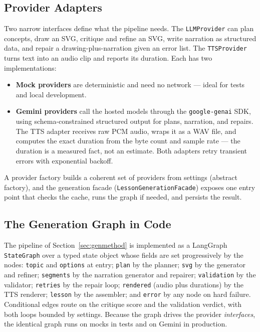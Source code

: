 \subsection{Provider Adapters}

Two narrow interfaces define what the pipeline needs. The \texttt{LLMProvider}
can plan concepts, draw an SVG, critique and refine an SVG, write narration
as structured data, and repair a drawing-plus-narration given an error list.
The \texttt{TTSProvider} turns text into an audio clip and reports its
duration. Each has two implementations:

\begin{itemize}
  \item \textbf{Mock providers} are deterministic and need no network ---
        ideal for tests and local development.
  \item \textbf{Gemini providers} call the hosted models through the
        \texttt{google-genai} SDK, using schema-constrained structured output
        for plans, narration, and repairs. The TTS adapter receives raw PCM
        audio, wraps it as a WAV file, and computes the exact duration from
        the byte count and sample rate --- the duration is a measured fact,
        not an estimate. Both adapters retry transient errors with
        exponential backoff.
\end{itemize}

A provider factory builds a coherent set of providers from settings
(abstract factory), and the generation facade
(\texttt{LessonGenerationFacade}) exposes one entry point that checks the
cache, runs the graph if needed, and persists the result.

\subsection{The Generation Graph in Code}

The pipeline of Section~\ref{sec:genmethod} is implemented as a LangGraph
\texttt{StateGraph} over a typed state object whose fields are set
progressively by the nodes: \texttt{topic} and \texttt{options} at entry;
\texttt{plan} by the planner; \texttt{svg} by the generator and refiner;
\texttt{segments} by the narration generator and repairer;
\texttt{validation} by the validator; \texttt{retries} by the repair loop;
\texttt{rendered} (audio plus durations) by the TTS renderer; \texttt{lesson}
by the assembler; and \texttt{error} by any node on hard failure. Conditional
edges route on the critique score and the validation verdict, with both loops
bounded by settings. Because the graph drives the provider \emph{interfaces},
the identical graph runs on mocks in tests and on Gemini in production.

